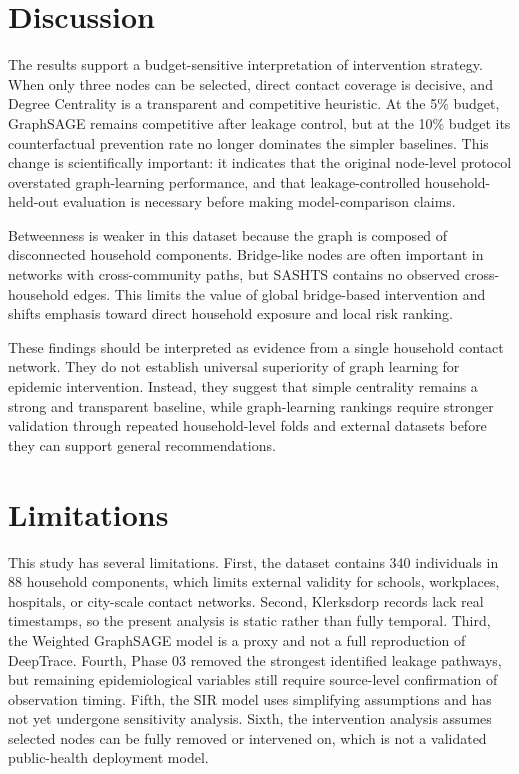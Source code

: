 \documentclass[11pt,a4paper]{article}
\begin{document}
\section{Discussion}

The results support a budget-sensitive interpretation of intervention strategy. When only three nodes can be selected, direct contact coverage is decisive, and Degree Centrality is a transparent and competitive heuristic. At the 5\% budget, GraphSAGE remains competitive after leakage control, but at the 10\% budget its counterfactual prevention rate no longer dominates the simpler baselines. This change is scientifically important: it indicates that the original node-level protocol overstated graph-learning performance, and that leakage-controlled household-held-out evaluation is necessary before making model-comparison claims.

Betweenness is weaker in this dataset because the graph is composed of disconnected household components. Bridge-like nodes are often important in networks with cross-community paths, but SASHTS contains no observed cross-household edges. This limits the value of global bridge-based intervention and shifts emphasis toward direct household exposure and local risk ranking.

These findings should be interpreted as evidence from a single household contact network. They do not establish universal superiority of graph learning for epidemic intervention. Instead, they suggest that simple centrality remains a strong and transparent baseline, while graph-learning rankings require stronger validation through repeated household-level folds and external datasets before they can support general recommendations.

\section{Limitations}

This study has several limitations. First, the dataset contains 340 individuals in 88 household components, which limits external validity for schools, workplaces, hospitals, or city-scale contact networks. Second, Klerksdorp records lack real timestamps, so the present analysis is static rather than fully temporal. Third, the Weighted GraphSAGE model is a proxy and not a full reproduction of DeepTrace. Fourth, Phase 03 removed the strongest identified leakage pathways, but remaining epidemiological variables still require source-level confirmation of observation timing. Fifth, the SIR model uses simplifying assumptions and has not yet undergone sensitivity analysis. Sixth, the intervention analysis assumes selected nodes can be fully removed or intervened on, which is not a validated public-health deployment model.
\end{document}
